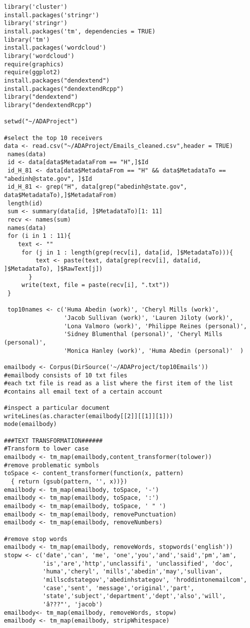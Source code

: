 \begin{verbatim}
library('cluster')
install.packages('stringr')
library('stringr')
install.packages('tm', dependencies = TRUE)
library('tm')
install.packages('wordcloud')
library('wordcloud')
require(graphics)
require(ggplot2)
install.packages("dendextend")
install.packages("dendextendRcpp")
library("dendextend")
library("dendextendRcpp")

setwd("~/ADAProject")

#select the top 10 receivers
data <- read.csv("~/ADAProject/Emails_cleaned.csv",header = TRUE)
 names(data)
 id <- data[data$MetadataFrom == "H",]$Id
 id_H_81 <- data[data$MetadataFrom == "H" && data$MetadataTo == "abedinh@state.gov", ]$Id
 id_H_81 <- grep("H", data[grep("abedinh@state.gov", data$MetadataTo),]$MetadataFrom)
 length(id)
 sum <- summary(data[id, ]$MetadataTo)[1: 11]
 recv <- names(sum)
 names(data)
 for (i in 1 : 11){
    text <- ""
     for (j in 1 : length(grep(recv[i], data[id, ]$MetadataTo))){
         text <- paste(text, data[grep(recv[i], data[id, ]$MetadataTo), ]$RawText[j])
       }
     write(text, file = paste(recv[i], ".txt"))
 }

 top10names <- c('Huma Abedin (work)', 'Cheryl Mills (work)', 
                 'Jacob Sullivan (work)', 'Lauren Jiloty (work)', 
                 'Lona Valmoro (work)', 'Philippe Reines (personal)', 
                 'Sidney Blumenthal (personal)', 'Cheryl Mills (personal)', 
                 'Monica Hanley (work)', 'Huma Abedin (personal)'  )

emailbody <- Corpus(DirSource('~/ADAProject/top10Emails'))
#emailbody consists of 10 txt files 
#each txt file is read as a list where the first item of the list
#contains all email text of a certain account

#inspect a particular document
writeLines(as.character(emailbody[[2]][[1]][1]))
mode(emailbody)

###TEXT TRANSFORMATION######
#Transform to lower case
emailbody <- tm_map(emailbody,content_transformer(tolower))
#remove problematic symbols
toSpace <- content_transformer(function(x, pattern) 
  { return (gsub(pattern, '', x))})
emailbody <- tm_map(emailbody, toSpace, '-')
emailbody <- tm_map(emailbody, toSpace, ':')
emailbody <- tm_map(emailbody, toSpace, ' " ')
emailbody <- tm_map(emailbody, removePunctuation)
emailbody <- tm_map(emailbody, removeNumbers)

#remove stop words
emailbody <- tm_map(emailbody, removeWords, stopwords('english'))
stopw <- c('date','can', 'me', 'one','you','and','said','pm','am',
           'is','are','http','unclassifi', 'unclassified', 'doc',
           'huma','cheryl', 'mills','abedin','may','sullivan',
           'millscdstategov','abedinhstategov', 'hroddintonemailcom',
           'case','sent', 'message','original','part',
           'state','subject','department','dept','also','will',
           'â???"', 'jacob')
emailbody<- tm_map(emailbody, removeWords, stopw)  
emailbody <- tm_map(emailbody, stripWhitespace)


\end{verbatim}
